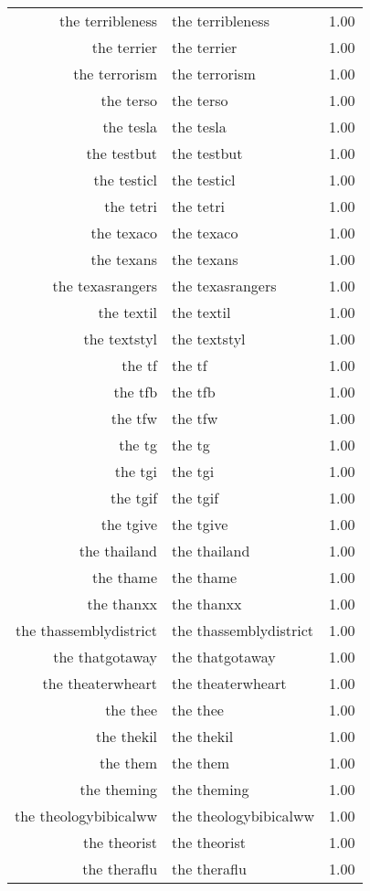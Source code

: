 \begin{table}[ht]
\begin{tabular}{rlr}
  the terribleness & the terribleness & 1.00 \\ 
  the terrier & the terrier & 1.00 \\ 
  the terrorism & the terrorism & 1.00 \\ 
  the terso & the terso & 1.00 \\ 
  the tesla & the tesla & 1.00 \\ 
  the testbut & the testbut & 1.00 \\ 
  the testicl & the testicl & 1.00 \\ 
  the tetri & the tetri & 1.00 \\ 
  the texaco & the texaco & 1.00 \\ 
  the texans & the texans & 1.00 \\ 
  the texasrangers & the texasrangers & 1.00 \\ 
  the textil & the textil & 1.00 \\ 
  the textstyl & the textstyl & 1.00 \\ 
  the tf & the tf & 1.00 \\ 
  the tfb & the tfb & 1.00 \\ 
  the tfw & the tfw & 1.00 \\ 
  the tg & the tg & 1.00 \\ 
  the tgi & the tgi & 1.00 \\ 
  the tgif & the tgif & 1.00 \\ 
  the tgive & the tgive & 1.00 \\ 
  the thailand & the thailand & 1.00 \\ 
  the thame & the thame & 1.00 \\ 
  the thanxx & the thanxx & 1.00 \\ 
  the thassemblydistrict & the thassemblydistrict & 1.00 \\ 
  the thatgotaway & the thatgotaway & 1.00 \\ 
  the theaterwheart & the theaterwheart & 1.00 \\ 
  the thee & the thee & 1.00 \\ 
  the thekil & the thekil & 1.00 \\ 
  the them & the them & 1.00 \\ 
  the theming & the theming & 1.00 \\ 
  the theologybibicalww & the theologybibicalww & 1.00 \\ 
  the theorist & the theorist & 1.00 \\ 
  the theraflu & the theraflu & 1.00 \\ 

\end{tabular}
\end{table}
